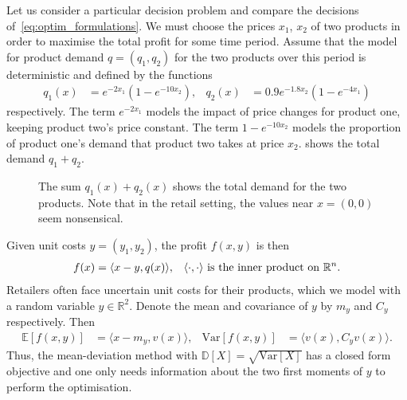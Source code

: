 \documentclass[main.tex]{subfiles}
\begin{document}
\begin{example}
  Let us consider a particular decision problem and compare the
  decisions of~\eqref{eq:optim_formulations}.
  We must choose the prices $x_1$, $x_2$ of two products in order to
  maximise the total profit for some time period.
  Assume that the model for product demand $q=(q_1,q_2)$ for the two products over
  this period is
  deterministic and defined by the functions
  \begin{align}
    q_1(x) &= e^{-2x_1}(1-e^{-10x_2}),
    &q_2(x)&= 0.9e^{-1.8x_2}(1-e^{-4x_1})
  \end{align}
  respectively.
  The term $e^{-2x_1}$  models the impact of price
  changes for product one, keeping product two's price constant.
  The term $1-e^{-10x_2}$ models the proportion of product one's
  demand that product two takes at price $x_2$.
   shows the total demand $q_1+q_2$.
  \begin{figure}[htbp]
    \centering
    \caption{The sum $q_1(x)+q_2(x)$ shows the total demand for the two products.
      Note that in the retail setting, the values near $x=(0,0)$ seem
      nonsensical.}\label{fig:total_volume_2d}
  \end{figure}

  Given unit costs $y=(y_1,y_2)$, the profit $f(x,y)$ is then
  \begin{align}
    f(x)
    &=\langle x-y,q(x) \rangle,
    &\langle \cdot,\cdot \rangle
      \textnormal{ is the inner product on } \mathbb{R}^n.
  \end{align}
  Retailers often face uncertain unit costs for their products, which
  we model with a random variable $y\in\mathbb{R}^2$.
  Denote the mean and covariance of
  $y$ by $m_y$ and $C_y$ respectively. Then
  \begin{align}
    \mathbb{E}[f(x,y)]
    &= \langle x-m_y,v(x) \rangle,
    &\mbox{Var}[f(x,y)]
    &= \langle v(x),C_y v(x) \rangle.
  \end{align}
  Thus, the mean-deviation method with
  $\mathbb{D}[X]=\sqrt{\mbox{Var}[X]}$ has a closed form objective and
  one only needs information about the two first moments of $y$ to perform
  the optimisation.


\end{example}
\end{document}
